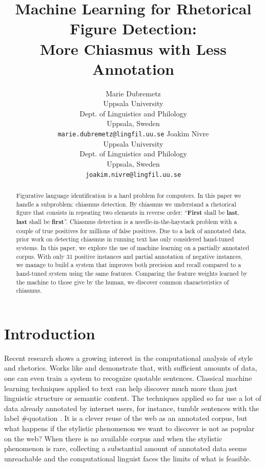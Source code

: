 \documentclass[11pt]{article}
\title{Machine Learning for Rhetorical Figure Detection: \\More Chiasmus with Less Annotation}
\author{
Marie Dubremetz\\
  Uppsala University \\
  Dept. of Linguistics and Philology \\ 
  Uppsala, Sweden \\
  {\small {\tt marie.dubremetz@lingfil.uu.se}}
	  \And
	  Joakim Nivre \\
  Uppsala University \\
  Dept. of Linguistics and Philology \\
    Uppsala, Sweden \\ 
 {\small  {\tt joakim.nivre@lingfil.uu.se}}
  }
\date{}
\newcommand{\mn}[1]{\textbf{#1}}
\begin{document}
\maketitle
\begin{abstract}

Figurative language identification is a hard problem for computers. In this paper we handle a subproblem: chiasmus detection. By chiasmus we understand a rhetorical figure that consists in repeating two elements in reverse order: ``\mn{First} shall be \mn{last}, \mn{last} shall be \mn{first}''.
Chiasmus detection is a needle-in-the-haystack problem with a couple of true positives for millions of false positives. 
Due to a lack of annotated data, prior work on detecting chiasmus in running text has only considered hand-tuned systems. 
In this paper, we explore the use of machine learning on a partially annotated corpus. With only 31 positive instances and
partial annotation of negative instances, we manage to build a system that improves both precision and recall compared
to a hand-tuned system using the same features. Comparing the feature weights learned by the machine to those 
give by the human, we discover common characteristics of chiasmus.
\end{abstract}




\section{Introduction}

Recent research shows a growing interest in the computational analysis of style and rhetorics. Works like  and  demonstrate that, with sufficient amounts of data, 
one can even train a system to recognize quotable sentences. Classical machine learning techniques applied to text can help discover much more than just linguistic structure or semantic content. The techniques applied so far use a lot of data already annotated by internet users, for instance, tumblr sentences with the label \#quotation \cite{Booten2016}. It is a clever reuse of the web as an annotated corpus, but what happens if the stylistic phenomenon we want to discover is not as popular on the web? When there is no available corpus and when the stylistic phenomenon is rare, collecting a substantial amount of annotated data seems unreachable and the computational linguist faces the limits of what is feasible.
\end{document}
